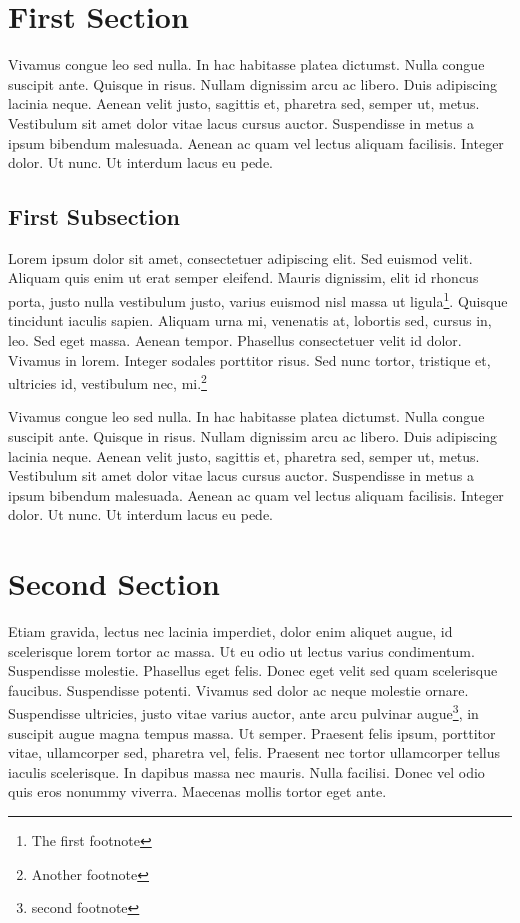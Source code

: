 \documentclass{article}
\begin{document}
\section{First Section}

Vivamus congue leo sed nulla. In hac habitasse platea dictumst. Nulla 
congue suscipit ante. Quisque in risus. Nullam dignissim arcu ac libero. 
Duis adipiscing lacinia neque. Aenean velit justo, sagittis et, pharetra 
sed\footnotemark, semper ut, metus. Vestibulum sit amet dolor vitae lacus cursus auctor. 
Suspendisse in metus a ipsum bibendum malesuada. Aenean ac quam vel lectus 
aliquam facilisis. Integer dolor. Ut nunc. Ut interdum lacus eu pede.


\subsection{First Subsection}

Lorem ipsum dolor sit amet, consectetuer adipiscing elit. Sed euismod 
velit. Aliquam quis enim ut erat semper eleifend. Mauris dignissim, elit 
id rhoncus porta, justo nulla vestibulum justo, varius euismod nisl massa 
ut ligula\footnote{The first footnote}. Quisque tincidunt iaculis sapien. Aliquam urna mi, venenatis at, 
lobortis sed, cursus in, leo. Sed eget massa. Aenean tempor. Phasellus 
consectetuer velit id dolor. Vivamus in lorem. Integer sodales porttitor 
risus. Sed nunc tortor, tristique et, ultricies id, vestibulum nec, mi.\footnote{Another footnote}

Vivamus congue leo sed nulla. In hac habitasse platea dictumst. Nulla 
congue suscipit ante. Quisque in risus. Nullam dignissim arcu ac libero. 
Duis adipiscing lacinia neque. Aenean velit justo, sagittis et, pharetra 
sed, semper ut, metus. Vestibulum sit amet dolor vitae lacus cursus auctor. 
Suspendisse in metus a ipsum bibendum malesuada. Aenean ac quam vel lectus 
aliquam facilisis. Integer dolor. Ut nunc. Ut interdum lacus eu pede.

\section{Second Section}

Etiam gravida, lectus nec lacinia imperdiet, dolor enim aliquet augue, 
id scelerisque lorem tortor ac massa. Ut eu odio ut lectus varius condimentum. 
Suspendisse molestie. Phasellus eget felis. Donec eget velit sed quam 
scelerisque faucibus. Suspendisse potenti. Vivamus sed dolor ac neque 
molestie ornare. Suspendisse ultricies, justo vitae varius auctor, ante 
arcu pulvinar augue\footnote{second footnote}, in suscipit augue magna tempus massa. Ut semper. 
Praesent felis ipsum, porttitor vitae, ullamcorper sed, pharetra vel, 
felis. Praesent nec tortor ullamcorper tellus iaculis scelerisque. In 
dapibus massa nec mauris. Nulla facilisi. Donec vel odio quis eros nonummy 
viverra. Maecenas mollis tortor eget ante.
\end{document}
